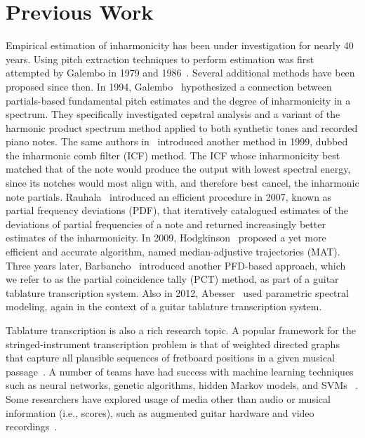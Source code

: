 \documentclass[convention,peer-reviewed]{aesconf}
\begin{document}
\section{Previous Work}

Empirical estimation of inharmonicity has been under investigation for nearly 40 years. Using pitch extraction techniques to perform estimation was first attempted by Galembo in 1979 and 1986~\cite{galembo1979,galembo1987}. Several additional methods have been proposed since then. In 1994, Galembo~\cite{galembo1994} hypothesized a connection between partials-based fundamental pitch estimates and the degree of inharmonicity in a spectrum. They specifically investigated cepstral analysis and a variant of the harmonic product spectrum method applied to both synthetic tones and recorded piano notes. The same authors in~\cite{galembo1999} introduced another method in 1999, dubbed the inharmonic comb filter (ICF) method. The ICF whose inharmonicity best matched that of the note would produce the output with lowest spectral energy, since its notches would most align with, and therefore best cancel, the inharmonic note partials. Rauhala~\cite{rauhala2007} introduced an efficient procedure in 2007, known as partial frequency deviations (PDF), that iteratively catalogued estimates of the deviations of partial frequencies of a note and returned increasingly better estimates of the inharmonicity. In 2009, Hodgkinson~\cite{hodgkinson2009} proposed a yet more efficient and accurate algorithm, named median-adjustive trajectories (MAT). Three years later, Barbancho~\cite{barbanchoi2012} introduced another PFD-based approach, which we refer to as the partial coincidence tally (PCT) method, as part of a guitar tablature transcription system. Also in 2012, Abesser~\cite{abesser2012} used parametric spectral modeling, again in the context of a guitar tablature transcription system.

Tablature transcription is also a rich research topic. A popular framework for the stringed-instrument transcription problem is that of weighted directed graphs that capture all plausible sequences of fretboard positions in a given musical passage~\cite{sayegh1989,radicioni2005,yazawa2013,burlet2013,burlet2015,radisav2004}. A number of teams have had success with machine learning techniques such as neural networks, genetic algorithms, hidden Markov models, and SVMs ~\cite{gagnon2003,tuohy2006,barbancho2009,barbanchoa2012,abesser2012,kehling2014,dittmar2013,abesser2012}. Some researchers have explored usage of media other than audio or musical information (i.e., scores), such as augmented guitar hardware and video recordings~\cite{ogrady2009,paleari2008,kerd2007}.
\end{document}
